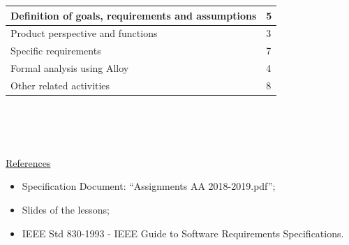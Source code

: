 \documentclass{article}
\begin{document}
\begin{legal}
{\begin{itemize}
\begin{tabular}{| m{9cm} | m{3cm}| }
				\hline
					Definition of goals, requirements and assumptions & 5 \\
				\hline
					Product perspective and functions & 3 \\
				\hline
					Specific requirements & 7 \\
				\hline
					Formal analysis using Alloy & 4 \\
				\hline
					Other related activities & 8 \\
				\hline
				\end{tabular}
				\\\\\\
		\end{itemize}
		}
	\item \underline{References}\\
		{\normalfont	
			\begin{itemize}
			\item Specification Document: “Assignments AA 2018-2019.pdf”;\\
			\item Slides of the lessons;\\
			\item IEEE Std 830-1993 - IEEE Guide to Software Requirements Specifications.\\
			\end{itemize}
		}
	\end{legal}
\end{document}
